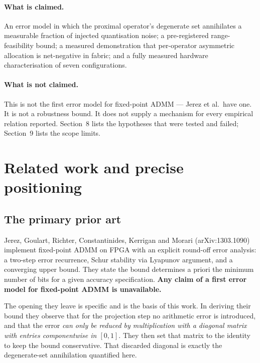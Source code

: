 \documentclass[11pt,a4paper]{article}
\begin{document}
\paragraph{What is claimed.} An error model in which the proximal operator's
degenerate set annihilates a measurable fraction of injected quantisation
noise; a pre-registered range-feasibility bound; a measured demonstration that
per-operator asymmetric allocation is net-negative in fabric; and a fully
measured hardware characterisation of seven configurations.

\paragraph{What is not claimed.} This is not the first error model for
fixed-point ADMM --- Jerez et al.\ have one. It is not a robustness bound. It
does not supply a mechanism for every empirical relation reported. Section~8
lists the hypotheses that were tested and failed; Section~9 lists the scope
limits.

\section{Related work and precise positioning}

\subsection{The primary prior art}

Jerez, Goulart, Richter, Constantinides, Kerrigan and Morari
(arXiv:1303.1090) implement fixed-point ADMM on FPGA with an explicit
round-off error analysis: a two-step error recurrence, Schur stability via
Lyapunov argument, and a converging upper bound. They state the bound
determines a priori the minimum number of bits for a given accuracy
specification. \textbf{Any claim of a first error model for fixed-point ADMM is
unavailable.}

The opening they leave is specific and is the basis of this work. In deriving
their bound they observe that for the projection step no arithmetic error is
introduced, and that the error \emph{can only be reduced by multiplication with
a diagonal matrix with entries componentwise in $[0,1]$}. They then set that
matrix to the identity to keep the bound conservative. That discarded diagonal
is exactly the degenerate-set annihilation quantified here.
\end{document}
